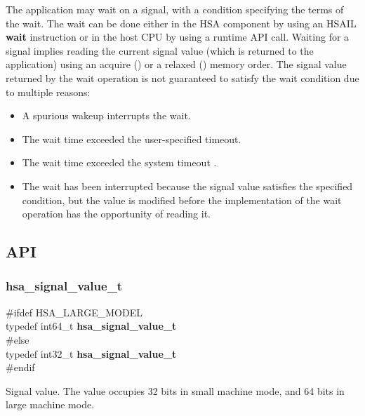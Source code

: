 \documentclass[final]{book}
\newcommand{\reffun}[1]{\textbf{#1}}
\newcommand{\refhsl}[1]{\reffun{#1}}
\newenvironment{mylongtable}{\rowcolors{0}{lightgray}{lightgray}\longtable} {
\endlongtable}
\begin{document}
The application may wait on a signal, with a condition specifying the terms of
the wait. The wait can be done either in the HSA component by using an HSAIL
\refhsl{wait} instruction or in the host CPU by using a runtime API
call. Waiting for a signal implies reading the current signal value (which is
returned to the application) using an acquire ()
or a relaxed () memory order. The signal value
returned by the wait operation is not guaranteed to satisfy the wait condition
due to multiple reasons:
\begin{itemize}[itemsep=1pt,topsep=3pt,partopsep=0pt]
\item A spurious wakeup interrupts the wait.
\item The wait time exceeded the user-specified timeout.
\item The wait time exceeded the system timeout
  .
\item The wait has been interrupted because the signal value satisfies the
  specified condition, but the value is modified before the implementation of
  the wait operation has the opportunity of reading it.
\end{itemize}


\subsection{API}

\subsubsection{hsa_\-signal_\-value_\-t}
\vspace{-3.5mm}\begin{mylongtable}{@{}p{\textwidth}}
\rule{0pt}{3ex}\hypertarget{group__signals_1ga67ca2818879c9990e1b5f1b14ce7ed27}{}
\#ifdef HSA_LARGE_MODEL\\
\hspace{1.7em}typedef int64_\-t  \textbf{hsa_\-signal_\-value_\-t}\\
\#else \\
\hspace{1.7em}typedef int32_\-t  \textbf{hsa_\-signal_\-value_\-t}\\
\#endif\rule[-2ex]{0pt}{0pt}
\end{mylongtable}
\vspace{-3mm}Signal value. The value occupies 32 bits in small machine mode, and 64 bits in large machine mode.
\\
\end{document}
